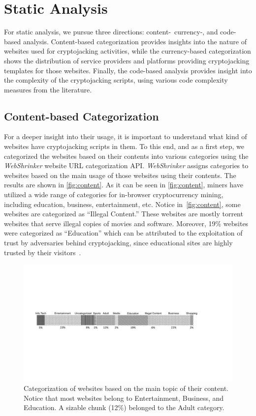 \documentclass[acmlarge]{acmart}
\newcommand{\etc}{{etc.}\xspace}
\newcommand{\cc}{{cryptocurrency}\xspace}
\newcommand{\cj}{cryptojacking\xspace}
\begin{document}
\section{Static Analysis} \label{sec:static}
For static analysis, we pursue three directions:  content-\, currency-, and code-based analysis. Content-based categorization provides insights into the nature of websites used for \cj activities, while the currency-based categorization shows the distribution of service providers and platforms providing \cj templates for those websites. Finally, the code-based analysis provides insight into the complexity of the \cj scripts, using various code complexity measures from the literature.  

\subsection{Content-based Categorization} \label{sec:contentcat} For a deeper insight into their usage, it is important to understand what kind of websites have \cj scripts in them. To this end, and as a first step, we categorized the websites based on their contents into various categories using the {\em WebShrinker} website URL categorization API. {\em WebShrinker} assigns categories to websites based on the main usage of those websites using their contents. The results are shown in \autoref{fig:content}. As it can be seen in \autoref{fig:content}, miners have utilized a wide range of categories for in-browser \cc mining, including education, business, entertainment, \etc Notice in~\autoref{fig:content}, some websites are categorized as ``Illegal Content.'' These websites are mostly torrent websites that serve illegal copies of movies and software. Moreover, 19\% websites were categorized as ``Education'' which can be attributed to the exploitation of trust by adversaries behind \cj, since educational sites are highly trusted by their visitors~\cite{ZarrasKSHKV14}. 

\begin{figure}
\centering
\includegraphics[width=16cm]{fig/Content_Categorization}
\caption{Categorization of websites based on the main topic of their content. Notice that most websites belong to Entertainment, Business, and Education. A sizable chunk (12\%) belonged to the Adult category. }
\label{fig:content}
\centering
\end{figure}
\end{document}
